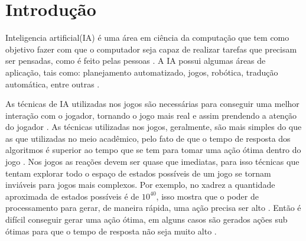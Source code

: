 \chapter{\label{chap:intro}Introdução}

Inteligencia artificial(IA) é uma área em ciência da computação que tem como objetivo fazer com que o computador seja capaz de realizar tarefas que precisam ser pensadas, como é feito pelas pessoas \cite{millington2009artificial}.  
A IA possui algumas áreas de aplicação, tais como: planejamento automatizado, jogos, robótica, tradução automática, entre outras \cite{intelligence2003modern}. 

As técnicas de IA utilizadas nos jogos são necessárias para conseguir uma melhor interação com o jogador, tornando o jogo mais real e assim prendendo a atenção do jogador \cite{millington2009artificial}. 
As técnicas utilizadas nos jogos, geralmente, são mais simples do que as que utilizadas no meio acadêmico, pelo fato de que o tempo de resposta dos algoritmos é superior ao tempo que se tem para tomar uma ação ótima dentro do jogo \cite{intelligence2003modern}. 
Nos jogos as reações devem ser quase que imediatas, para isso técnicas que tentam explorar todo o espaço de estados possíveis de um jogo se tornam inviáveis para jogos mais complexos.
Por exemplo, no xadrez a quantidade aproximada de estados possíveis é de $10^{40}$, isso mostra que o poder de processamento para gerar, de maneira rápida, uma ação precisa ser alto \cite{millington2009artificial}. Então é difícil conseguir gerar uma ação ótima, em alguns casos são gerados ações sub ótimas para que o tempo de resposta não seja muito alto \cite{intelligence2003modern}. 


